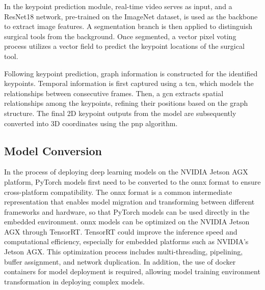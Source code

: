 \documentclass[12pt]{article}
\begin{document}
In the keypoint prediction module, real-time video serves as input, and a ResNet18 network, pre-trained on the ImageNet dataset, is used as the backbone to extract image features. A segmentation branch is then applied to distinguish surgical tools from the background. Once segmented, a vector pixel voting process utilizes a vector field to predict the keypoint locations of the surgical tool\cite{xu2023graph}.

Following keypoint prediction, graph information is constructed for the identified keypoints. Temporal information is first captured using a \gls{tcn}\cite{zeng2020srnet}, which models the relationships between consecutive frames. Then, a \gls{gcn}\cite{yan2018spatial} extracts spatial relationships among the keypoints, refining their positions based on the graph structure\cite{xu2023graph}. The final 2D keypoint outputs from the model are subsequently converted into 3D coordinates using the \gls{pnp} algorithm\cite{yun2017object}.


\subsection{Model Conversion}
In the process of deploying deep learning models on the NVIDIA Jetson AGX platform, PyTorch models first need to be converted to the \gls{onnx} format to ensure cross-platform compatibility. The \gls{onnx} format is a common intermediate representation that enables model migration and transforming between different frameworks and hardware, so that PyTorch models can be used directly in the embedded environment. \gls{onnx} models can be optimized on the NVIDIA Jetson AGX through TensorRT. TensorRT could improve the inference speed and computational efficiency, especially for embedded platforms such as NVIDIA's Jetson AGX. This optimization process includes multi-threading, pipelining, buffer assignment, and network duplication\cite{Jeong2022TensorRTBasedFA}\cite{karumbunathan2022nvidia}. In addition, the use of docker containers for model deployment is required, allowing model training environment transformation in deploying complex models\cite{10283807}.
\end{document}
